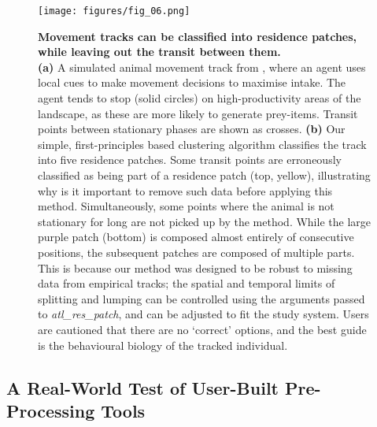 \begin{refsection}[sorting=nyt]
    \begin{figure}[h!]
        \centering
        \texttt{[image: figures/fig\_06.png]}
        \caption{
            \textbf{Movement tracks can be classified into residence patches, while leaving out the transit between them.}\\
            \textbf{(a)} A simulated animal movement track from \citealt{gupte2021a}, where an agent uses local cues to make movement decisions to maximise intake.
            The agent tends to stop (solid circles) on high-productivity areas of the landscape, as these are more likely to generate prey-items.
            Transit points between stationary phases are shown as crosses.
            \textbf{(b)} Our simple, first-principles based clustering algorithm classifies the track into five residence patches. 
            Some transit points are erroneously classified as being part of a residence patch (top, yellow), illustrating why is it important to remove such data before applying this method.
            Simultaneously, some points where the animal is not stationary for long are not picked up by the method.
            While the large purple patch (bottom) is composed almost entirely of consecutive positions, the subsequent patches are composed of multiple parts.
            This is because our method was designed to be robust to missing data from empirical tracks; the spatial and temporal limits of splitting and lumping can be controlled using the arguments passed to \textit{atl\_res\_patch}, and can be adjusted to fit the study system.
            Users are cautioned that there are no `correct' options, and the best guide is the behavioural biology of the tracked individual.
        }
        \label{fig:figure_residence_patch}
    \end{figure}

    \subsection*{A Real-World Test of User-Built Pre-Processing Tools}


\end{refsection}
